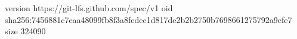 version https://git-lfs.github.com/spec/v1
oid sha256:7456881c7eaa48099fb8f3a8fedec1d817de2b2b2750b7698661275792a9efe7
size 324090
